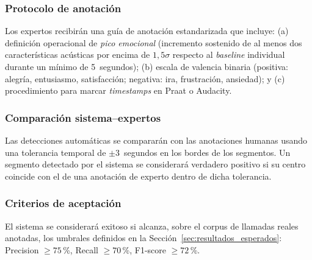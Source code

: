 \subsubsection{Protocolo de anotación}

Los expertos recibirán una guía de anotación estandarizada que incluye: (a) definición
operacional de \textit{pico emocional} (incremento sostenido de al menos dos
características acústicas por encima de $1{,}5\sigma$ respecto al \textit{baseline}
individual durante un mínimo de 5~segundos); (b) escala de valencia binaria
(positiva: alegría, entusiasmo, satisfacción; negativa: ira, frustración, ansiedad);
y (c) procedimiento para marcar \textit{timestamps} en Praat o Audacity.

\subsubsection{Comparación sistema--expertos}

Las detecciones automáticas se compararán con las anotaciones humanas usando una
tolerancia temporal de $\pm 3$~segundos en los bordes de los segmentos. Un segmento
detectado por el sistema se considerará verdadero positivo si su centro coincide con
el de una anotación de experto dentro de dicha tolerancia.

\subsubsection{Criterios de aceptación}

El sistema se considerará exitoso si alcanza, sobre el corpus de llamadas reales
anotadas, los umbrales definidos en la Sección~\ref{sec:resultados_esperados}:
Precision $\geq 75$\,\%, Recall $\geq 70$\,\%, F1-score $\geq 72$\,\%.
